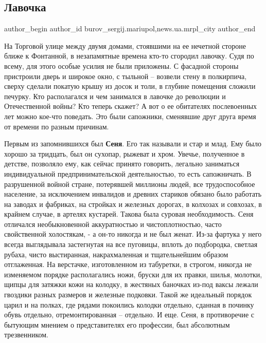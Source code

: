  
 
 
 
 
 
\subsection{Лавочка}
\label{sec:12_05_2018.stz.news.ua.mrpl_city.1.lavochka}
 
\ifcmt
 author_begin
   author_id burov_sergij.mariupol,news.ua.mrpl_city
 author_end
\fi


На Торговой улице между двумя домами, стоявшими на ее нечетной стороне ближе к
Фонтанной, в незапамятные времена кто-то сгородил лавочку. Судя по всему, для
этого особые усилия не были приложены. С фасадной стороны пристроили дверь и
широкое окно, с тыльной – возвели стену в полкирпича, сверху сделали покатую
крышу из досок и толи, в глубине помещения сложили печурку. Кто располагался и
чем занимался в лавочке до революции и Отечественной войны? Кто теперь скажет?
А вот о ее обитателях послевоенных лет можно кое-что поведать. Это были
сапожники, сменявшие друг друга время от времени по разным причинам.

Первым из запомнившихся был \textbf{Сеня}. Его так называли и стар и млад. Ему было
хорошо за тридцать, был он сухопар, рыжеват и хром. Увечье, полученное в
детстве, позволяло ему, как сейчас принято говорить, легально заниматься
индивидуальной предпринимательской деятельностью, то есть сапожничать. В
разрушенной войной стране, потерявшей миллионы людей, все трудоспособное
население, за исключением инвалидов и древних стариков обязано было работать на
заводах и фабриках, на стройках и железных дорогах, в колхозах и совхозах, в
крайнем случае, в артелях кустарей. Такова была суровая необходимость. Сеня
отличался необыкновенной аккуратностью и чистоплотностью, часто свойственной
холостякам, - а он-то никогда и не был женат. Из-за фартука у него всегда
выглядывала застегнутая на все пуговицы, вплоть до подбородка, светлая рубаха,
чисто выстиранная, накрахмаленная и тщательнейшим образом отглаженная. На
верстачке, изготовленном из табуретки, в строгом, никогда не изменяемом порядке
располагались ножи, бруски для их правки, шилья, молотки, щипцы для затяжки
кожи на колодку, в жестяных баночках из-под ваксы лежали гвоздики разных
размеров и железные подковки. Такой же идеальный порядок царил и на полках, где
рядами покоились колодки отдельно, сданная в починку обувь отдельно,
отремонтированная – отдельно. И еще. Сеня, в противоречие с бытующим мнением о
представителях его профессии, был абсолютным трезвенником.

